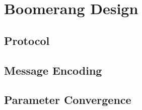 \section{Boomerang Design}

\subsection{Protocol}

\subsection{Message Encoding}

\subsection{Parameter Convergence}
